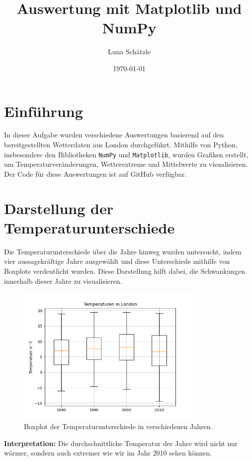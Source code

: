 \documentclass{article}
\title{Auswertung mit Matplotlib und NumPy}
\author{Luna Schätzle}
\date{\today}
\begin{document}
\maketitle

\newpage

\section{Einführung}
In dieser Aufgabe wurden verschiedene Auswertungen basierend auf den bereitgestellten Wetterdaten aus London durchgeführt. 
Mithilfe von Python, insbesondere den Bibliotheken \texttt{NumPy} und \texttt{Matplotlib}, wurden Grafiken erstellt, um Temperaturveränderungen, 
Wetterextreme und Mittelwerte zu visualisieren. Der Code für diese Auswertungen ist auf GitHub verfügbar.

\section{Darstellung der Temperaturunterschiede}
Die Temperaturunterschiede über die Jahre hinweg wurden untersucht, 
indem vier aussagekräftige Jahre ausgewählt und diese Unterschiede mithilfe von Boxplots verdeutlicht wurden. Diese Darstellung hilft dabei, 
die Schwankungen innerhalb dieser Jahre zu visualisieren.

\begin{figure}[h!]
    \centering
    \includegraphics[width=0.8\textwidth]{A_1_1.png}
    \caption{Boxplot der Temperaturunterschiede in verschiedenen Jahren.}
\end{figure}

\textbf{Interpretation:} Die durchschnittliche Temperatur der Jahre wird nicht nur wärmer, sondern auch extremer wie wir im Jahr 2010 sehen können.
\end{document}
